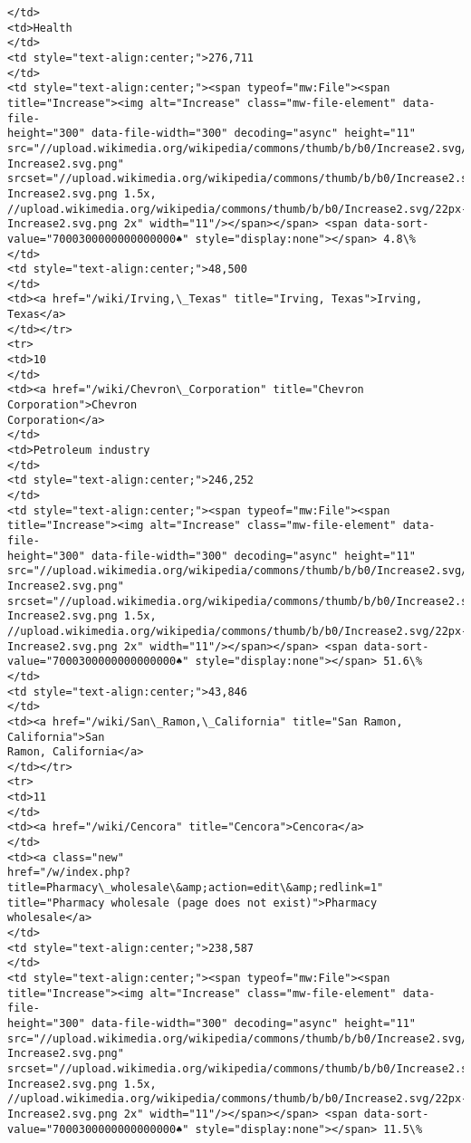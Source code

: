 \documentclass[11pt]{article}
\begin{document}
\begin{Verbatim}[commandchars=\\\{\}]
</td>
<td>Health
</td>
<td style="text-align:center;">276,711
</td>
<td style="text-align:center;"><span typeof="mw:File"><span
title="Increase"><img alt="Increase" class="mw-file-element" data-file-
height="300" data-file-width="300" decoding="async" height="11"
src="//upload.wikimedia.org/wikipedia/commons/thumb/b/b0/Increase2.svg/11px-
Increase2.svg.png"
srcset="//upload.wikimedia.org/wikipedia/commons/thumb/b/b0/Increase2.svg/17px-
Increase2.svg.png 1.5x,
//upload.wikimedia.org/wikipedia/commons/thumb/b/b0/Increase2.svg/22px-
Increase2.svg.png 2x" width="11"/></span></span> <span data-sort-
value="7000300000000000000♠" style="display:none"></span> 4.8\%
</td>
<td style="text-align:center;">48,500
</td>
<td><a href="/wiki/Irving,\_Texas" title="Irving, Texas">Irving, Texas</a>
</td></tr>
<tr>
<td>10
</td>
<td><a href="/wiki/Chevron\_Corporation" title="Chevron Corporation">Chevron
Corporation</a>
</td>
<td>Petroleum industry
</td>
<td style="text-align:center;">246,252
</td>
<td style="text-align:center;"><span typeof="mw:File"><span
title="Increase"><img alt="Increase" class="mw-file-element" data-file-
height="300" data-file-width="300" decoding="async" height="11"
src="//upload.wikimedia.org/wikipedia/commons/thumb/b/b0/Increase2.svg/11px-
Increase2.svg.png"
srcset="//upload.wikimedia.org/wikipedia/commons/thumb/b/b0/Increase2.svg/17px-
Increase2.svg.png 1.5x,
//upload.wikimedia.org/wikipedia/commons/thumb/b/b0/Increase2.svg/22px-
Increase2.svg.png 2x" width="11"/></span></span> <span data-sort-
value="7000300000000000000♠" style="display:none"></span> 51.6\%
</td>
<td style="text-align:center;">43,846
</td>
<td><a href="/wiki/San\_Ramon,\_California" title="San Ramon, California">San
Ramon, California</a>
</td></tr>
<tr>
<td>11
</td>
<td><a href="/wiki/Cencora" title="Cencora">Cencora</a>
</td>
<td><a class="new"
href="/w/index.php?title=Pharmacy\_wholesale\&amp;action=edit\&amp;redlink=1"
title="Pharmacy wholesale (page does not exist)">Pharmacy wholesale</a>
</td>
<td style="text-align:center;">238,587
</td>
<td style="text-align:center;"><span typeof="mw:File"><span
title="Increase"><img alt="Increase" class="mw-file-element" data-file-
height="300" data-file-width="300" decoding="async" height="11"
src="//upload.wikimedia.org/wikipedia/commons/thumb/b/b0/Increase2.svg/11px-
Increase2.svg.png"
srcset="//upload.wikimedia.org/wikipedia/commons/thumb/b/b0/Increase2.svg/17px-
Increase2.svg.png 1.5x,
//upload.wikimedia.org/wikipedia/commons/thumb/b/b0/Increase2.svg/22px-
Increase2.svg.png 2x" width="11"/></span></span> <span data-sort-
value="7000300000000000000♠" style="display:none"></span> 11.5\%

\end{Verbatim}
\end{document}
